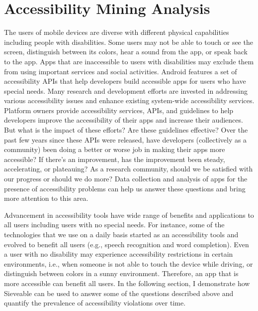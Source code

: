 \section{Accessibility Mining Analysis}
The users of mobile devices are diverse with different physical capabilities including people with disabilities.
Some users may not be able to touch or see the screen, distinguish between its colors, hear a sound from the app, or speak back to the app.
Apps that are inaccessible to users with disabilities may exclude them from using important services and social activities.
Android features a set of accessibility APIs that help developers build accessible apps for users who have special needs.
Many research and development efforts are invested in addressing various accessibility issues and enhance existing system-wide accessibility services.
Platform owners provide accessibility services, APIs, and guidelines to help developers improve the accessibility of their apps and increase their audiences.
But what is the impact of these efforts?
Are these guidelines effective?
Over the past few years since these APIs were released, have developers (collectively as a community) been doing a better or worse job in making their apps more accessible?
If there's an improvement, has the improvement been steady, accelerating, or plateauing?
As a research community, should we be satisfied with our progress or should we do more?
Data collection and analysis of apps for the presence of accessibility problems can help us answer these questions and bring more attention to this area.

Advancement in accessibility tools have wide range of benefits and applications to all users including users with no special needs.
For instance, some of the technologies that we use on a daily basis started as an accessibility tools and evolved to benefit all users (e.g., speech recognition and word completion).
Even a user with no disability may experience accessibility restrictions in certain environments, i.e., when someone is not able to touch the device while driving, or distinguish between colors in a sunny environment.
Therefore, an app that is more accessible can benefit all users.
In the following section, I demonstrate how Sieveable can be used to answer some of the questions described above and quantify the prevalence of accessibility violations over time.

